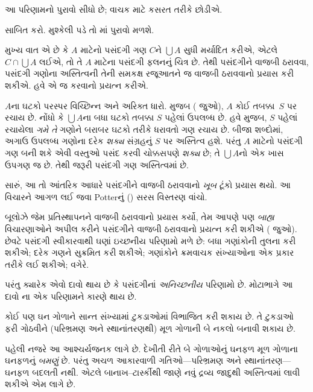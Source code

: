 આ પરિણામનો પુરાવો સીધો છે;
વાચક માટે કસરત તરીકે છોડીએ.

\begin{prob}
સાબિત કરો. મુશ્કેલી પડે તો
\cite[pp.~242--3]{Potter2004}માં
પુરાવો મળશે.
\end{prob}

મુખ્ય વાત એ છે કે $A$ માટેનો પસંદગી
ગણ $C$ને $\bigcup A$ સુધી મર્યાદિત કરીએ, એટલે
$C\cap\bigcup A$ લઈએ, તો તે $A$ માટેના પસંદગી ફલનનું
ચિત્ર છે. તેથી પસંદગીને વાજબી
ઠરાવવા, પસંદગી ગણોના અસ્તિત્વની
તેની સમકક્ષ રજૂઆતને જ વાજબી
ઠરાવવાનો પ્રયાસ કરી શકીએ.
હવે એ જ કરવાનો પ્રયત્ન કરીએ.

$A$ના ઘટકો પરસ્પર વિચ્છિન્ન
અને અરિક્ત ધારો. \stageshier{} મુજબ
( જુઓ), $A$
કોઈ તબક્કા~$S$ પર રચાય છે.
નોંધો કે $\bigcup A$ના બધા
ઘટકો તબક્કા $S$ પહેલાં
ઉપલબ્ધ છે. હવે \stagesacc{} મુજબ,
$S$ પહેલાં રચાયેલા \emph{ગમે તે}
ગણોને બરાબર ઘટકો તરીકે ધરાવતો
ગણ રચાય છે. બીજા શબ્દોમાં,
અગાઉ ઉપલબ્ધ ગણોના દરેક
\emph{શક્ય} સંગ્રહનું $S$ પર
અસ્તિત્વ હશે. પરંતુ $A$ માટેનો
પસંદગી ગણ બની શકે એવી વસ્તુઓ
પસંદ કરવી ચોક્કસપણે \emph{શક્ય}
છે; તે $\bigcup A$નો એક ખાસ
ઉપગણ જ છે. તેથી જરૂરી પસંદગી
ગણ અસ્તિત્વમાં છે.

સારું, આ તો આંતરિક આધારે પસંદગીને
વાજબી ઠરાવવાનો \emph{ખૂબ} ટૂંકો
પ્રયાસ થયો. આ વિચારને આગળ
લઈ જવા Potterનું
(\citeyear[\S14.8]{Potter2004})
સરસ વિસ્તરણ વાંચો.
\endgroup

\begingroup
\makeatletter{}\makeatother

\label{guunit:OLP-0599}


બૂલોઝે જેમ પ્રતિસ્થાપનને વાજબી
ઠરાવવાનો પ્રયાસ કર્યો, તેમ આપણે
પણ \emph{બાહ્ય} વિચારણાઓને અપીલ
કરીને પસંદગીને વાજબી ઠરાવવાનો
પ્રયત્ન કરી શકીએ
( જુઓ).
છેવટે પસંદગી સ્વીકારવાથી ઘણાં
ઇચ્છનીય પરિણામો મળે છે: બધા ગણાંકોની
તુલના કરી શકીએ; દરેક ગણને સુક્રમિત
કરી શકીએ; ગણાંકોને ક્રમવાચક
સંખ્યાઓના એક પ્રકાર તરીકે લઈ શકીએ;
વગેરે.

પરંતુ ક્યારેક એવો દાવો થાય છે કે
પસંદગીનાં \emph{અનિચ્છનીય} પરિણામો
છે. મોટાભાગે આ દાવો
\cite{BanachTarski1924}ના એક
પરિણામને કારણે થાય છે.

\begin{thm}[બાનાખ--ટાર્સ્કીનો વિરોધાભાસ ($\ZFC$માં)]
કોઈ પણ ઘન ગોળાને સાન્ત સંખ્યામાં
ટુકડાઓમાં વિભાજિત કરી શકાય છે.
તે ટુકડાઓ ફરી ગોઠવીને (પરિભ્રમણ
અને સ્થાનાંતરણથી) મૂળ ગોળાની
બે નકલો બનાવી શકાય છે.
\end{thm}
\noindent
પહેલી નજરે આ આશ્ચર્યજનક લાગે છે.
દેખીતી રીતે બે ગોળાઓનું ઘનફળ
મૂળ ગોળાના ઘનફળનું \emph{બમણું} છે.
પરંતુ અચળ આકારવાળી ગતિઓ---પરિભ્રમણ
અને સ્થાનાંતરણ---ઘનફળ બદલતી નથી.
એટલે બાનાખ--ટાર્સ્કીથી જાણે
નવું દ્રવ્ય જાદુથી અસ્તિત્વમાં
લાવી શકીએ એમ લાગે છે.

